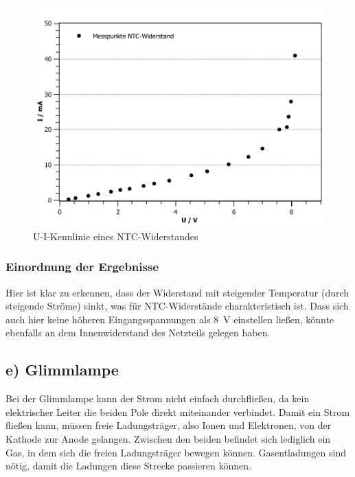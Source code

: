 \documentclass[11pt,a4paper,titlepage, ngerman]{article}
\begin{document}
				\begin{figure}[ht]
					\centering
					\includegraphics[width=\textwidth]{KennlinieNTCsubgitter_2.pdf}
					\caption{U-I-Kennlinie eines NTC-Widerstandes}
					\label{KL d}
				\end{figure}
			
			\subsubsection*{Einordnung der Ergebnisse}
			
				Hier ist klar zu erkennen, dass der Widerstand mit steigender Temperatur (durch steigende Ströme) sinkt, was für NTC-Widerstände charakteristisch ist. 
				Dass sich auch hier keine höheren Eingangsspannungen als \SI{8}{\volt} einstellen ließen, könnte ebenfalls an dem Innenwiderstand des Netzteils gelegen haben.
			
		\subsection{e) Glimmlampe} 
			
			Bei der Glimmlampe kann der Strom nicht einfach durchfließen, da kein elektrischer Leiter die beiden Pole direkt miteinander verbindet.
			Damit ein Strom fließen kann, müssen freie Ladungsträger, also Ionen und Elektronen, von der Kathode zur Anode gelangen.
			Zwischen den beiden befindet sich lediglich ein Gas, in dem sich die freien Ladungsträger bewegen können. Gasentladungen sind nötig, damit die Ladungen diese Strecke passieren können.
			
\end{document}
